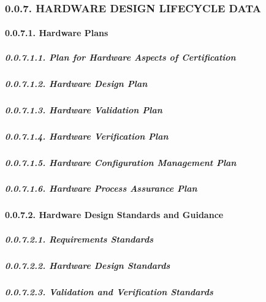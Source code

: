 \documentclass[
]{article}
\begin{document}
\hypertarget{hardware-design-lifecycle-data}{%
\subsubsection{0.0.7. HARDWARE DESIGN LIFECYCLE
DATA}\label{hardware-design-lifecycle-data}}

\hypertarget{hardware-plans}{%
\paragraph{0.0.7.1. Hardware Plans}\label{hardware-plans}}

\hypertarget{plan-for-hardware-aspects-of-certification}{%
\subparagraph{0.0.7.1.1. Plan for Hardware Aspects of
Certification}\label{plan-for-hardware-aspects-of-certification}}

\hypertarget{hardware-design-plan}{%
\subparagraph{0.0.7.1.2. Hardware Design
Plan}\label{hardware-design-plan}}

\hypertarget{hardware-validation-plan}{%
\subparagraph{0.0.7.1.3. Hardware Validation
Plan}\label{hardware-validation-plan}}

\hypertarget{hardware-verification-plan}{%
\subparagraph{0.0.7.1.4. Hardware Verification
Plan}\label{hardware-verification-plan}}

\hypertarget{hardware-configuration-management-plan}{%
\subparagraph{0.0.7.1.5. Hardware Configuration Management
Plan}\label{hardware-configuration-management-plan}}

\hypertarget{hardware-process-assurance-plan}{%
\subparagraph{0.0.7.1.6. Hardware Process Assurance
Plan}\label{hardware-process-assurance-plan}}

\hypertarget{hardware-design-standards-and-guidance}{%
\paragraph{0.0.7.2. Hardware Design Standards and
Guidance}\label{hardware-design-standards-and-guidance}}

\hypertarget{requirements-standards}{%
\subparagraph{0.0.7.2.1. Requirements
Standards}\label{requirements-standards}}

\hypertarget{hardware-design-standards}{%
\subparagraph{0.0.7.2.2. Hardware Design
Standards}\label{hardware-design-standards}}

\hypertarget{validation-and-verification-standards}{%
\subparagraph{0.0.7.2.3. Validation and Verification
Standards}\label{validation-and-verification-standards}}
\end{document}
